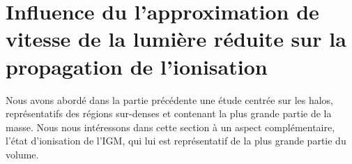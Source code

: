 \chapter{Influence du l'approximation de vitesse de la lumière réduite sur la propagation de l'ionisation}
\label{sec:intre:zreio}




Nous avons abordé dans la partie précédente une étude centrée sur les halos, représentatifs des régions sur-denses et contenant la plus grande partie de la masse.
Nous nous intéressons dans cette section à un aspect complémentaire, l'état d'ionisation de l'\ac{IGM}, qui lui est représentatif de la plus grande partie du volume.

